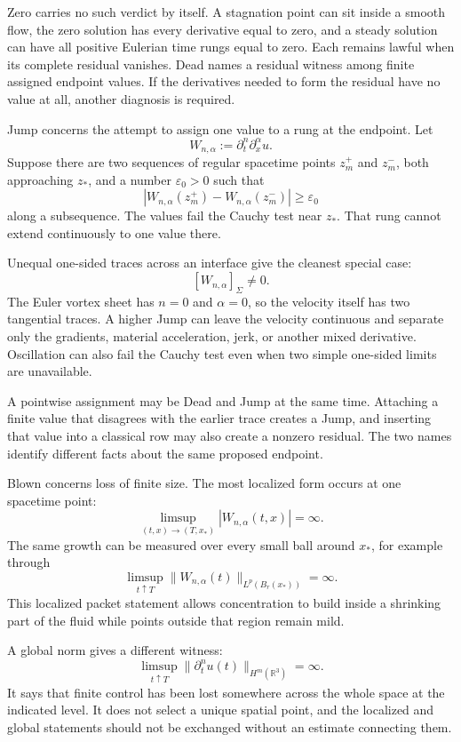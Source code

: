 Zero carries no such verdict by itself.
A stagnation point can sit inside a smooth flow, the zero solution has every derivative equal to zero, and a steady solution can have all positive Eulerian time rungs equal to zero.
Each remains lawful when its complete residual vanishes.
Dead names a residual witness among finite assigned endpoint values.
If the derivatives needed to form the residual have no value at all, another diagnosis is required.


Jump concerns the attempt to assign one value to a rung at the endpoint.
Let
\[
  W_{n,\alpha}
  :=
  \partial_t^n\partial_x^\alpha u.
\]
Suppose there are two sequences of regular spacetime points \(z_m^+\) and \(z_m^-\), both approaching \(z_*\), and a number \(\varepsilon_0>0\) such that
\[
  \left|
    W_{n,\alpha}(z_m^+)
    -
    W_{n,\alpha}(z_m^-)
  \right|
  \geq
  \varepsilon_0
\]
along a subsequence.
The values fail the Cauchy test near \(z_*\).
That rung cannot extend continuously to one value there.

Unequal one-sided traces across an interface give the cleanest special case:
\[
  [W_{n,\alpha}]_\Sigma\neq0.
\]
The Euler vortex sheet has \(n=0\) and \(\alpha=0\), so the velocity itself has two tangential traces.
A higher Jump can leave the velocity continuous and separate only the gradients, material acceleration, jerk, or another mixed derivative.
Oscillation can also fail the Cauchy test even when two simple one-sided limits are unavailable.

A pointwise assignment may be Dead and Jump at the same time.
Attaching a finite value that disagrees with the earlier trace creates a Jump, and inserting that value into a classical row may also create a nonzero residual.
The two names identify different facts about the same proposed endpoint.


Blown concerns loss of finite size.
The most localized form occurs at one spacetime point:
\[
  \limsup_{(t,x)\to(T,x_*)}
  |W_{n,\alpha}(t,x)|
  =
  \infty.
\]
The same growth can be measured over every small ball around \(x_*\), for example through
\[
  \limsup_{t\uparrow T}
  \|W_{n,\alpha}(t)\|_{L^p(B_r(x_*))}
  =
  \infty.
\]
This localized packet statement allows concentration to build inside a shrinking part of the fluid while points outside that region remain mild.

A global norm gives a different witness:
\[
  \limsup_{t\uparrow T}
  \|\partial_t^n u(t)\|_{H^m(\mathbb R^3)}
  =
  \infty.
\]
It says that finite control has been lost somewhere across the whole space at the indicated level.
It does not select a unique spatial point, and the localized and global statements should not be exchanged without an estimate connecting them.

